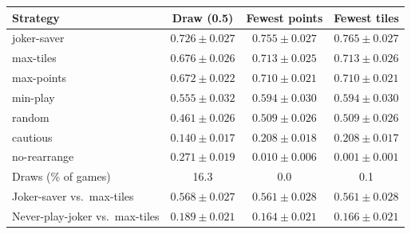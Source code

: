 \begin{tabular}{@{}lccc@{}}\toprule
Strategy & Draw (0.5) & Fewest points & Fewest tiles\\\midrule
joker-saver & $0.726\pm0.027$ & $0.755\pm0.027$ & $0.765\pm0.027$ \\
max-tiles & $0.676\pm0.026$ & $0.713\pm0.025$ & $0.713\pm0.026$ \\
max-points & $0.672\pm0.022$ & $0.710\pm0.021$ & $0.710\pm0.021$ \\
min-play & $0.555\pm0.032$ & $0.594\pm0.030$ & $0.594\pm0.030$ \\
random & $0.461\pm0.026$ & $0.509\pm0.026$ & $0.509\pm0.026$ \\
cautious & $0.140\pm0.017$ & $0.208\pm0.018$ & $0.208\pm0.017$ \\
no-rearrange & $0.271\pm0.019$ & $0.010\pm0.006$ & $0.001\pm0.001$ \\
\midrule
Draws (\% of games) & 16.3 & 0.0 & 0.1 \\
Joker-saver vs.\ max-tiles & $0.568\pm0.027$ & $0.561\pm0.028$ & $0.561\pm0.028$ \\
Never-play-joker vs.\ max-tiles & $0.189\pm0.021$ & $0.164\pm0.021$ & $0.166\pm0.021$ \\
\bottomrule
\end{tabular}
